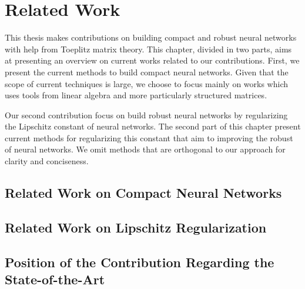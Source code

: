 \chapter{Related Work}
\label{chapter:ch3-related_work}
\localtoc


This thesis makes contributions on building compact and robust neural networks with help from Toeplitz matrix theory.
This chapter, divided in two parts, aims at presenting an overview on current works related to our contributions.
First, we present the current methods to build compact neural networks.  
Given that the scope of current techniques is large, we choose to focus mainly on works which uses tools from linear algebra and more particularly structured matrices.

Our second contribution focus on build robust neural networks by regularizing the Lipschitz constant of neural networks.
The second part of this chapter present current methods for regularizing this constant that aim to improving the robust of neural networks.
We omit methods that are orthogonal to our approach for clarity and conciseness.


\section{Related Work on Compact Neural Networks}
\label{section:ch3-related_work_on_compact_neural_networks}


\section{Related Work on Lipschitz Regularization}
\label{section:ch3-related_work_on_lipschitz_regularization}


\section{Position of the Contribution Regarding the State-of-the-Art}
\label{section:ch3-position_of_the_contribution_regarding_the_state-of-the-art}

